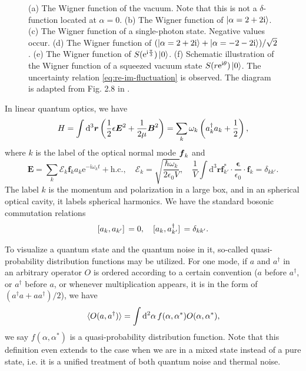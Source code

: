 \documentclass[hyperref, a4paper]{article}
\newcommand*{\ii}{\mathrm{i}}
\newcommand*{\ee}{\mathrm{e}}
\begin{document}
\begin{figure}
{    (a) The Wigner function of the vacuum. Note that this is not a $\delta$-function located at $\alpha = 0$.
    (b) The Wigner function of $\ket{\alpha = 2 + 2\ii}$.
    (c) The Wigner function of a single-photon state. Negative values occur.
    (d) The Wigner function of $(\ket{\alpha = 2 + 2 \ii} + \ket{\alpha = - 2 - 2 \ii}) / \sqrt{2}$.
    (e) The Wigner function of $S(\ee^{\ii \frac{\pi}{3}}) \ket{0}$.
    (f) Schematic illustration of the Wigner function of a squeezed vacuum state
    $S(r\ee^{\ii \theta}) \ket{0}$.
    The uncertainty relation \eqref{eq:re-im-fluctuation} is observed.
    The diagram is adapted from Fig. 2.8 in \cite{scully1999quantum}.
    }
    \label{fig:wigner-example}
\end{figure}

In linear quantum optics, we have \cite{steck2007quantum} 
\begin{equation}
    H = \int \dd[3]{\vb*{r}} \left( \frac{1}{2} \epsilon \vb*{E}^2 + \frac{1}{2 \mu} \vb*{B}^2 \right)
    = \sum_{k} \omega_k \left( a^\dagger_k a_k + \frac{1}{2} \right),
\end{equation}
where $k$ is the label of the optical normal mode $\vb*{f}_k$ and 
\begin{equation}
    \boldsymbol{E}=\sum_k \mathcal{E}_k \boldsymbol{f}_k a_k \mathrm{e}^{-\mathrm{i} \omega_k t}+\text {h.c.} , \quad 
    \mathcal{E}_k = \sqrt{\frac{\hbar \omega_k}{2 \epsilon_0 V}} , \quad \frac{1}{V} \int \mathrm{d}^3 \boldsymbol{r} \boldsymbol{f}_{k'}^* \cdot \frac{\boldsymbol{\epsilon}}{\epsilon_0} \cdot \boldsymbol{f}_k =\delta_{k k'} .
\end{equation}
The label $k$ is the momentum and polarization in a large box, 
and in an spherical optical cavity, it labels spherical harmonics.
We have the standard bosonic commutation relations 
\begin{equation}
    \comm*{a_k}{a_{k'}} = 0, \quad \comm*{a_k}{a^\dagger_{k'}} = \delta_{k k'}.
\end{equation}

To visualize a quantum state and the quantum noise in it,
so-called quasi-probability distribution functions may be utilized.
For one mode, if $a$ and $a^\dagger$ in an arbitrary operator $O$ is ordered according to a certain convention
($a$ before $a^\dagger$, or $a^\dagger$ before $a$, 
or whenever multiplication appears, it is in the form of $(a^\dagger a + a a^\dagger) / 2$), 
we have 
\begin{equation}
    \expval*{O(a, a^\dagger)} = \int \dd[2]{\alpha} f(\alpha, \alpha^*) O(\alpha, \alpha^*),
\end{equation}
we say $f(\alpha, \alpha^*)$ is a quasi-probability distribution function.
Note that this definition even extends to the case 
when we are in a mixed state instead of a pure state, 
i.e. it is a unified treatment of both quantum noise and thermal noise.
\end{document}
